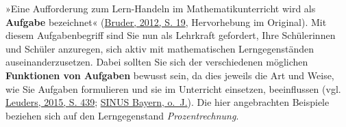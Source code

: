 \documentclass[
]{scrbook}
\theoremstyle{definition}
\theoremstyle{definition}
\theoremstyle{definition}
\theoremstyle{definition}
\theoremstyle{remark}
\begin{document}
»Eine Aufforderung zum Lern-Handeln im Mathematikunterricht wird als \textbf{Aufgabe} bezeichnet« (\protect\hyperlink{ref-Bruder2012}{Bruder, 2012, S. 19}, Hervorhebung im Original). Mit diesem Aufgabenbegriff sind Sie nun als Lehrkraft gefordert, Ihre Schülerinnen und Schüler anzuregen, sich aktiv mit mathematischen Lerngegenständen auseinanderzusetzen. Dabei sollten Sie sich der verschiedenen möglichen \textbf{Funktionen von Aufgaben} bewusst sein, da dies jeweils die Art und Weise, wie Sie Aufgaben formulieren und sie im Unterricht einsetzen, beeinflussen (vgl. \protect\hyperlink{ref-Leuders2015}{Leuders, 2015, S. 439}; \protect\hyperlink{ref-SINUSBayern}{SINUS Bayern, o.~J.}). Die hier angebrachten Beispiele beziehen sich auf den Lerngegenstand \emph{Prozentrechnung}.
\end{document}
